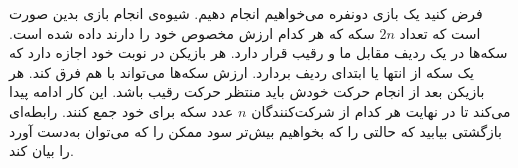     \p 
فرض کنید یک بازی دونفره می‌خواهیم انجام دهیم. شیوه‌ی انجام بازی بدین صورت است که تعداد
$2n$
سکه که هر کدام ارزش مخصوص خود را دارند داده شده است. سکه‌ها در یک ردیف مقابل ما و رقیب قرار دارد. هر بازیکن در نوبت خود اجازه دارد که یک سکه از انتها یا ابتدای ردیف بردارد. ارزش سکه‌ها می‌تواند با هم فرق کند. هر بازیکن بعد از انجام حرکت خودش باید منتظر حرکت رقیب باشد. این کار ادامه پیدا می‌کند تا در نهایت هر کدام از شرکت‌کنندگان
$n$
عدد سکه برای خود جمع کنند. رابطه‌ای بازگشتی‌ بیابید که حالتی را که بخواهیم بیش‌تر سود ممکن را که می‌توان به‌دست آورد را بیان کند.